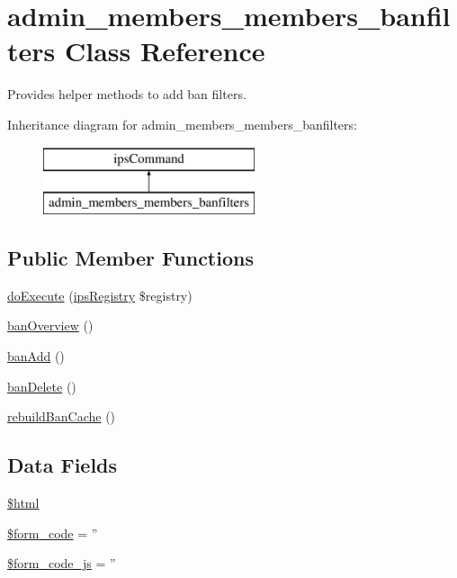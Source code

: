 \hypertarget{classadmin__members__members__banfilters}{\section{admin\-\_\-members\-\_\-members\-\_\-banfilters Class Reference}
\label{classadmin__members__members__banfilters}
}


Provides helper methods to add ban filters.  


Inheritance diagram for admin\-\_\-members\-\_\-members\-\_\-banfilters\-:\begin{figure}[H]
\begin{center}
\leavevmode
\includegraphics[height=2.000000cm]{classadmin__members__members__banfilters}
\end{center}
\end{figure}
\subsection*{Public Member Functions}
\begin{DoxyCompactItemize}
\item 
\hyperlink{classadmin__members__members__banfilters_afbc4e912a0604b94d47d66744c64d8ba}{do\-Execute} (\hyperlink{classips_registry}{ips\-Registry} \$registry)
\item 
\hyperlink{classadmin__members__members__banfilters_aa3d401a6d08f53cf765395b0b7a3b6ab}{ban\-Overview} ()
\item 
\hyperlink{classadmin__members__members__banfilters_a113ed5401edd89a82889f0533b2ea79e}{ban\-Add} ()
\item 
\hyperlink{classadmin__members__members__banfilters_a224b64e22b6c87f21e62902ad2997e82}{ban\-Delete} ()
\item 
\hyperlink{classadmin__members__members__banfilters_a518597615a30f599733a58c1f9146b3e}{rebuild\-Ban\-Cache} ()
\end{DoxyCompactItemize}
\subsection*{Data Fields}
\begin{DoxyCompactItemize}
\item 
\hyperlink{classadmin__members__members__banfilters_a6f96e7fc92441776c9d1cd3386663b40}{\$html}
\item 
\hyperlink{classadmin__members__members__banfilters_af28aee726fa3eb6c355d08a2ab655e03}{\$form\-\_\-code} = ''
\item 
\hyperlink{classadmin__members__members__banfilters_ac68fe8a02a2efd63c3271179f4b4fbb7}{\$form\-\_\-code\-\_\-js} = ''
\end{DoxyCompactItemize}

